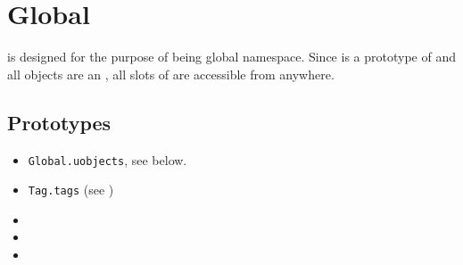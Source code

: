 \section{Global}

 is designed for the purpose of being global
namespace. Since  is a prototype of  and all
objects are an , all slots of  are accessible from
anywhere.

\subsection{Prototypes}
\begin{itemize}
\item \lstinline|Global.uobjects|, see below.
\item \lstinline|Tag.tags| (see )
\item {}
\item {}
\item {}
\end{itemize}

